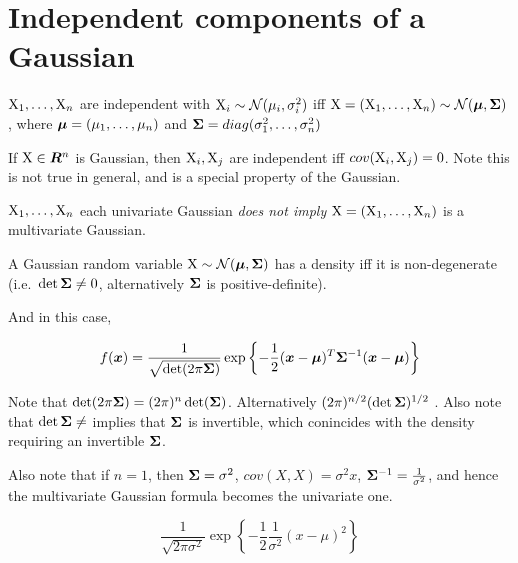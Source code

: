 \section{Independent components of a Gaussian}

${\textnormal{X}}_1, \dots, {\textnormal{X}}_n$ are independent with ${\textnormal{X}}_i \sim {\mathcal{N}}(\mu_i, \sigma_i^2)$ iff ${\textnormal{X}} = ({\textnormal{X}}_1, \dots, {\textnormal{X}}_n) \sim {\mathcal{N}}({\bm{\mu}}, {\bm{\Sigma}})$, where ${\bm{\mu}} = (\mu_1, \dots, \mu_n)$ and ${\bm{\Sigma}} = diag(\sigma_1^2, \dots, \sigma_n^2)$

\begin{thm} If ${\textnormal{X}} \in {\bm{R}}^n$ is Gaussian, then ${\textnormal{X}}_i, {\textnormal{X}}_j$ are independent iff $cov({\textnormal{X}}_i, {\textnormal{X}}_j) = 0$. Note this is not true in general, and is a special property of the Gaussian.

\end{thm}

\begin{thm}
${\textnormal{X}}_1, \dots, {\textnormal{X}}_n$ each univariate Gaussian \emph{does not imply} ${\textnormal{X}} = ({\textnormal{X}}_1, \dots, {\textnormal{X}}_n)$ is a multivariate Gaussian.

\end{thm}

\begin{thm}
A Gaussian random variable ${\textnormal{X}} \sim {\mathcal{N}}({\bm{\mu}}, {\bm{\Sigma}})$ has a density iff it is non-degenerate (i.e.\ $\det {\bm{\Sigma}} \neq 0$, alternatively ${\bm{\Sigma}}$ is positive-definite).

And in this case,

\begin{equation}
    f({\bm{x}}) = \frac{1}{\sqrt{\det(2 \pi {\bm{\Sigma}})}} \exp{ \left\{ - \frac{1}{2} ({\bm{x}}- {\bm{\mu}})^T {\bm{\Sigma}}^{-1} ({\bm{x}}- {\bm{\mu}}) \right\} }
\end{equation}

Note that $\det(2 \pi {\bm{\Sigma}}) = (2\pi)^n \det({\bm{\Sigma}})$. Alternatively $(2 \pi)^{n/2} (\det {\bm{\Sigma}})^{1/2}$ . Also note that $\det {\bm{\Sigma}} \neq$ implies that ${\bm{\Sigma}}$ is invertible, which conincides with the density requiring an invertible ${\bm{\Sigma}}$.

Also note that if $n = 1$, then ${\bm{\Sigma}} = \sigma^2$, $cov(X, X) = \sigma^2 x$, ${\bm{\Sigma}}^{-1} = \frac{1}{\sigma^2}$, and hence the multivariate Gaussian formula becomes the univariate one.

\begin{equation}
    \frac{1}{\sqrt{2 \pi \sigma^2}} \exp{\left\{ - \frac{1}{2} \frac{1}{\sigma^2} (x - \mu)^2\right\}}
\end{equation}
\end{thm}

